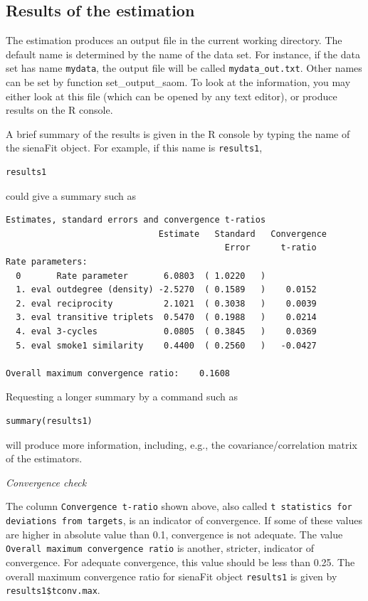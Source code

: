 \documentclass[a4paper,fleqn,11pt]{article}
\newcommand{\+}{\, + \,}
\newcommand{\sfn}[1]{\textsf{#1}}
\newcommand{\R}{{\sf R }}
\begin{document}
\subsection{Results of the estimation}

The estimation produces an output file in the current working directory.
The default name is determined by the name of the data set.
For instance, if the data set has name \texttt{mydata}, the output file
will be called \texttt{mydata\_out.txt}.
Other names can be set by function \sfn{set\_output\_saom}.
To look at the information, you may either look at this file
(which can be opened by any text editor), or produce results on the \R console.

A brief summary of the results is given in the \R console by
typing the name of the  \sfn{sienaFit} object. For example,
if this name is \texttt{results1},
\begin{verbatim}
results1
\end{verbatim}
could give a summary such as
\par
{\footnotesize
\begin{verbatim}
Estimates, standard errors and convergence t-ratios
                              Estimate   Standard   Convergence
                                           Error      t-ratio
Rate parameters:
  0       Rate parameter       6.0803  ( 1.0220   )
  1. eval outdegree (density) -2.5270  ( 0.1589   )    0.0152
  2. eval reciprocity          2.1021  ( 0.3038   )    0.0039
  3. eval transitive triplets  0.5470  ( 0.1988   )    0.0214
  4. eval 3-cycles             0.0805  ( 0.3845   )    0.0369
  5. eval smoke1 similarity    0.4400  ( 0.2560   )   -0.0427

Overall maximum convergence ratio:    0.1608
\end{verbatim}
}
Requesting a longer summary by a command such as
\begin{verbatim}
summary(results1)
\end{verbatim}
will produce more information, including, e.g.,
the covariance/correlation matrix of the estimators.
\bigskip

\emph{Convergence check}
\smallskip

\noindent
The column \texttt{\small Convergence t-ratio} shown above, also
called \texttt{\small t statistics for deviations from targets},
is an indicator of convergence. If some of these values
are higher in absolute value than 0.1, convergence is not adequate.
The value \texttt{Overall maximum convergence ratio} is another, stricter,
indicator of convergence.
For adequate convergence, this value should be less than 0.25.
The overall maximum convergence ratio for \sfn{sienaFit} object \texttt{results1}
is given by  \texttt{results1\$tconv.max}.
\end{document}
